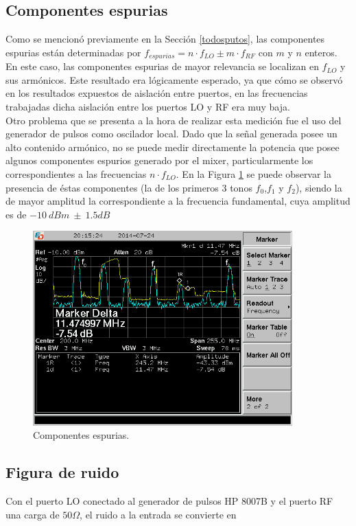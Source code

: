 \documentclass[a4paper,10pt]{article}
\begin{document}
	\subsection{Componentes espurias}
	\indent Como se mencion\'o previamente en la Secci\'on \ref{todosputos}, las
	componentes espurias est\'an determinadas por 
	$f_{espurias}=n\cdot f_{LO}\pm m\cdot f_{RF}$ con $m$ y $n$ enteros. En este
	caso, las componentes espurias de mayor relevancia se localizan en $f_{LO}$ 
	y sus arm\'onicos. Este resultado era l\'ogicamente esperado, ya que c\'omo 
	se observ\'o en los resultados expuestos de aislaci\'on entre puertos, en 
	las frecuencias trabajadas dicha aislaci\'on entre los puertos LO y RF era 
	muy baja. \\
	\indent Otro problema que se presenta a la hora de realizar esta medición 
	fue el uso del generador de pulsos como oscilador local. Dado que la señal
	generada posee un alto contenido armónico, no se puede medir directamente la
	potencia que posee algunos componentes espurios generado por el mixer, 
	particularmente los correspondientes a las frecuencias $n\cdot f_{LO}$.
	\indent En la Figura \ref{espurios} se puede observar la presencia de 
	\'estas componentes (la de los primeros 3 tonos $f_0$,$f_1$ y $f_2$), siendo
	la de mayor amplitud la correspondiente a la frecuencia fundamental, cuya 
	amplitud es de $-10~dBm~\pm~1.5dB$
	
	\begin{figure}[!htb]
		\centering
		\includegraphics[width=10cm]{Images/SCREN539.png}
		\caption{Componentes espurias.}
		\label{espurios}
	\end{figure}
		
	\subsection{Figura de ruido}
	\indent Con el puerto LO conectado al generador de pulsos HP 8007B y el 
	puerto RF una carga de $50\Omega$, el ruido a la entrada se convierte en 
\end{document}
